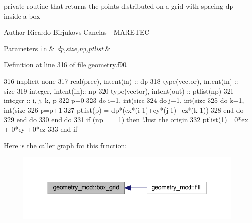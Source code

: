 private routine that returns the points distributed on a grid with spacing dp inside a box 

\begin{DoxyAuthor}{Author}
Ricardo Birjukovs Canelas -\/ M\+A\+R\+E\+T\+EC
\end{DoxyAuthor}

\begin{DoxyParams}[1]{Parameters}
\mbox{\tt in}  & {\em dp,size,np,ptlist} & \\
\hline
\end{DoxyParams}


Definition at line 316 of file geometry.\+f90.


\begin{DoxyCode}
316     \textcolor{keywordtype}{implicit none}
317     \textcolor{keywordtype}{real(prec)}, \textcolor{keywordtype}{intent(in)} :: dp
318     \textcolor{keywordtype}{type}(vector), \textcolor{keywordtype}{intent(in)} :: size
319     \textcolor{keywordtype}{integer}, \textcolor{keywordtype}{intent(in)}::  np
320     \textcolor{keywordtype}{type}(vector), \textcolor{keywordtype}{intent(out)} :: ptlist(np)
321     \textcolor{keywordtype}{integer} :: i, j, k, p
322     p=0
323     \textcolor{keywordflow}{do} i=1, int(size%
324         \textcolor{keywordflow}{do} j=1, int(size%
325             \textcolor{keywordflow}{do} k=1, int(size%
326                 p=p+1
327                 ptlist(p) = dp*(ex*(i-1)+ey*(j-1)+ez*(k-1))
328 \textcolor{keywordflow}{            end do}
329 \textcolor{keywordflow}{        end do}
330 \textcolor{keywordflow}{    end do}
331     \textcolor{keywordflow}{if} (np == 1) \textcolor{keywordflow}{then} \textcolor{comment}{!Just the origin}
332         ptlist(1)= 0*ex + 0*ey +0*ez
333 \textcolor{keywordflow}{    end if}
\end{DoxyCode}
Here is the caller graph for this function\+:\nopagebreak
\begin{figure}[H]
\begin{center}
\leavevmode
\includegraphics[width=336pt]{namespacegeometry__mod_ae87e4ecff2d21a839da2b82919b5fd0b_icgraph}
\end{center}
\end{figure}
\mbox{\label{namespacegeometry__mod_a095a8b47b3c23e154dcd31ab1441a065}} 

